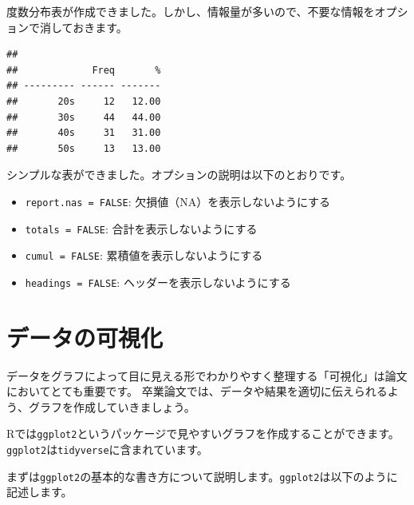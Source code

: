 \documentclass[]{book}
\newenvironment{Shaded}{\begin{snugshade}}{\end{snugshade}}
\newcommand{\KeywordTok}[1]{\textcolor[rgb]{0.13,0.29,0.53}{\textbf{#1}}}
\newcommand{\DataTypeTok}[1]{\textcolor[rgb]{0.13,0.29,0.53}{#1}}
\newcommand{\StringTok}[1]{\textcolor[rgb]{0.31,0.60,0.02}{#1}}
\newcommand{\OtherTok}[1]{\textcolor[rgb]{0.56,0.35,0.01}{#1}}
\newcommand{\OperatorTok}[1]{\textcolor[rgb]{0.81,0.36,0.00}{\textbf{#1}}}
\newcommand{\NormalTok}[1]{#1}
\providecommand{\tightlist}{%
  \setlength{\itemsep}{0pt}\setlength{\parskip}{0pt}}
\begin{document}
度数分布表が作成できました。しかし、情報量が多いので、不要な情報をオプションで消しておきます。

\begin{Shaded}
\end{Shaded}

\begin{verbatim}
## 
##             Freq       %
## --------- ------ -------
##       20s     12   12.00
##       30s     44   44.00
##       40s     31   31.00
##       50s     13   13.00
\end{verbatim}

シンプルな表ができました。オプションの説明は以下のとおりです。

\begin{itemize}
\tightlist
\item
  \texttt{report.nas\ =\ FALSE}: 欠損値（NA）を表示しないようにする
\item
  \texttt{totals\ =\ FALSE}: 合計を表示しないようにする
\item
  \texttt{cumul\ =\ FALSE}: 累積値を表示しないようにする
\item
  \texttt{headings\ =\ FALSE}: ヘッダーを表示しないようにする
\end{itemize}

\chapter{データの可視化}\label{Visualization}

データをグラフによって目に見える形でわかりやすく整理する「可視化」は論文においてとても重要です。
卒業論文では、データや結果を適切に伝えられるよう、グラフを作成していきましょう。

Rでは\texttt{ggplot2}というパッケージで見やすいグラフを作成することができます。
\texttt{ggplot2}は\texttt{tidyverse}に含まれています。

まずは\texttt{ggplot2}の基本的な書き方について説明します。\texttt{ggplot2}は以下のように記述します。

\begin{Shaded}
\end{Shaded}
\end{document}

